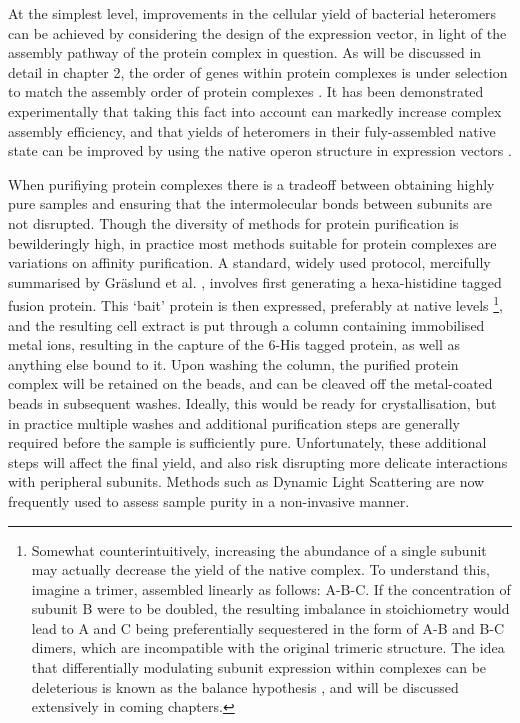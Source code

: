 \documentclass[a4paper,11pt,twoside,openright]{scrbook}
\let\cite\supercite
\begin{document}
At the simplest level, improvements in the cellular yield of bacterial heteromers can be achieved by considering the design of the expression vector, in light of the assembly pathway of the protein complex in question. As will be discussed in detail in chapter 2, the order of genes within protein complexes is under selection to match the assembly order of protein complexes \cite{Wells2016}. It has been demonstrated experimentally that taking this fact into account can markedly increase complex assembly efficiency, and that yields of heteromers in their fuly-assembled native state can be improved by using the native operon structure in expression vectors \cite{Shieh2015a, Poulsen2010}.

When purifiying protein complexes there is a tradeoff between obtaining highly pure samples and ensuring that the intermolecular bonds between subunits are not disrupted. Though the diversity of methods for protein purification is bewilderingly high, in practice most methods suitable for protein complexes are variations on affinity purification. A standard, widely used protocol, mercifully summarised by Gr{\"a}slund et al. \cite{Graslund2008}, involves first generating a hexa-histidine tagged fusion protein. This `bait' protein is then expressed, preferably at native levels \footnote{Somewhat counterintuitively, increasing the abundance of a single subunit may actually decrease the yield of the native complex. To understand this, imagine a trimer, assembled linearly as follows: A-B-C. If the concentration of subunit B were to be doubled, the resulting imbalance in stoichiometry would lead to A and C being preferentially sequestered in the form of A-B and B-C dimers, which are incompatible with the original trimeric structure. The idea that differentially modulating subunit expression within complexes can be deleterious is known as the balance hypothesis \cite{Papp2003}, and will be discussed extensively in coming chapters.}, and the resulting cell extract is put through a column containing immobilised metal ions, resulting in the capture of the 6-His tagged protein, as well as anything else bound to it. Upon washing the column, the purified protein complex will be retained on the beads, and can be cleaved off the metal-coated beads in subsequent washes. Ideally, this would be ready for crystallisation, but in practice multiple washes and additional purification steps are generally required before the sample is sufficiently pure. Unfortunately, these additional steps will affect the final yield, and also risk disrupting more delicate interactions with peripheral subunits. Methods such as Dynamic Light Scattering are now frequently used to assess sample purity in a non-invasive manner.
\end{document}
